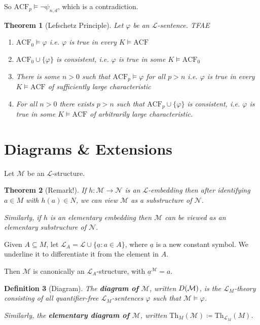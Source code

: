 \documentclass[]{article}
\theoremstyle{custhm}
\newtheorem{theorem}{Theorem}[section]
\theoremstyle{cusdef}
\newtheorem{defin}[theorem]{Definition}
\theoremstyle{custhm}
\theoremstyle{custhm}
\theoremstyle{custhm}
\theoremstyle{ex}
\theoremstyle{custhm}
\theoremstyle{cusdef}
\theoremstyle{remark}
\theoremstyle{remark}
\newcommand{\ra}{\rightarrow}
\newcommand{\undf}[1]{\textit{\textbf{#1}}}
\renewcommand{\L}{\mathcal{L}}
\renewcommand{\it}[1]{\textit{#1}}
\newcommand{\M}{\mathcal{M}}
\renewcommand{\phi}{\varphi}
\newcommand{\Th}{\textrm{Th}}
\newcommand{\N}{\mathcal{N}}
\newcommand{\acf}{\textrm{ACF}}
\newcommand{\D}{\mathcal{D}}
\renewcommand{\subset}{\subseteq}
\begin{document}
So $\acf_p\models \neg\psi_{n,d}$, which is a contradiction.
\begin{theorem}[Lefschetz Principle]
Let $\phi$ be an $\L$-sentence. TFAE
\begin{enumerate}[label=(\arabic*)]
	\item $\acf_0\models \phi$ {\it i.e.} $\phi$ is true in every $K\models \acf$
	\item $\acf_0\cup\{\phi\}$ is consistent, {\it i.e.} $\phi$ is true in some $K\models \acf_0$
	\item There is some $n > 0$ such that $\acf_p\models\phi$ for all $p > n$ {\it i.e.} $\phi$ is true in every $K\models \acf$ of sufficiently large characteristic
	\item For all $n > 0$ there exists $p > n$ such that $\acf_p\cup\{\phi\}$ is consistent, {\it i.e.} $\phi$ is true in some $K\models \acf$ of arbitrarily large characteristic.
\end{enumerate}
\end{theorem}


\section{Diagrams \& Extensions}

Let $\M$ be an $\L$-structure.

\begin{theorem}[Remark!]
If $h:\M\ra\N$ is an $\L$-embedding then after identifying $a\in M$ with $h(a) \in N$, we can view $\M$ as a substructure of $\N$.

Similarly, if $h$ is an elementary embedding then $\M$ can be viewed as an elementary substructure of $\N$.
\end{theorem}

Given $A\subset M$, let $\L_A = \L\cup\{\underline{a}:a\in A\}$, where $\underline{a}$ is a new constant symbol. We underline it to differentiate it from the element in $A$.

Then $\M$ is canonically an $\L_A$-structure, with $\underline{a}^\M = a$.

\begin{defin}[Diagram]
The \undf{diagram of $\M$}, written $\\D(\M)$, is the $\L_M$-theory consisting of all quantifier-free $\L_M$-sentences $\phi$ such that $\M\models \phi$.

Similarly, the \undf{elementary diagram of $\M$}, written $\Th_M(\M)\coloneqq \Th_{\L_M}(M)$.
\end{defin}
\end{document}
